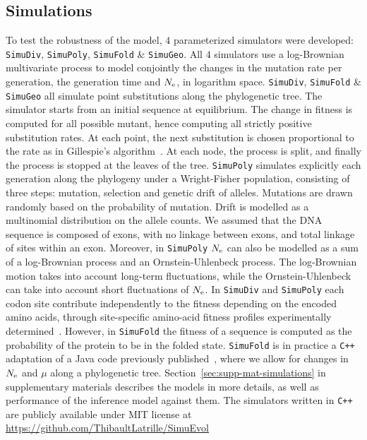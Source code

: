 \subsection{Simulations}
\label{sec:Simulation}
To test the robustness of the model, $4$ parameterized simulators were developed: \texttt{SimuDiv}, \texttt{SimuPoly}, \texttt{SimuFold} \& \texttt{SimuGeo}.
All $4$ simulators use a log-Brownian multivariate process to model conjointly the changes in the mutation rate per generation, the generation time and $N_{\text{e}}$, in logarithm space.
\texttt{SimuDiv}, \texttt{SimuFold} \& \texttt{SimuGeo} all simulate point substitutions along the phylogenetic tree.
The simulator starts from an initial sequence at equilibrium.
The change in fitness is computed for all possible mutant, hence computing all strictly positive substitution rates.
At each point, the next substitution is chosen proportional to the rate as in Gillespie's algorithm~\citep{Gillespie1977}.
At each node, the process is split, and finally the process is stopped at the leaves of the tree.
\texttt{SimuPoly} simulates explicitly each generation along the phylogeny under a Wright-Fisher population, consisting of three steps: mutation, selection and genetic drift of alleles.
Mutations are drawn randomly based on the probability of mutation.
Drift is modelled as a multinomial distribution on the allele counts.
We assumed that the \acrshort{DNA} sequence is composed of exons, with no linkage between exons, and total linkage of sites within an exon.
Moreover, in \texttt{SimuPoly} $N_{\text{e}}$ can also be modelled as a sum of a log-Brownian process and an Ornstein-Uhlenbeck process.
The log-Brownian motion takes into account long-term fluctuations, while the Ornstein-Uhlenbeck can take into account short fluctuations of $N_{\text{e}}$.
In \texttt{SimuDiv} and \texttt{SimuPoly} each codon site contribute independently to the fitness depending on the encoded amino acids, through site-specific amino-acid fitness profiles experimentally determined~\citep{Bloom2017}.
However, in \texttt{SimuFold} the fitness of a sequence is computed as the probability of the protein to be in the folded state.
\texttt{SimuFold} is in practice a \texttt{C++} adaptation of a Java code previously published~\citep{Goldstein2016, Goldstein2017}, where we allow for changes in $N_{\text{e}}$ and $\mu$ along a phylogenetic tree.
Section~\ref{sec:supp-mat-simulations} in supplementary materials describes the models in more details, as well as performance of the inference model against them.
The simulators written in \texttt{C++} are publicly available under MIT license at \url{https://github.com/ThibaultLatrille/SimuEvol}
